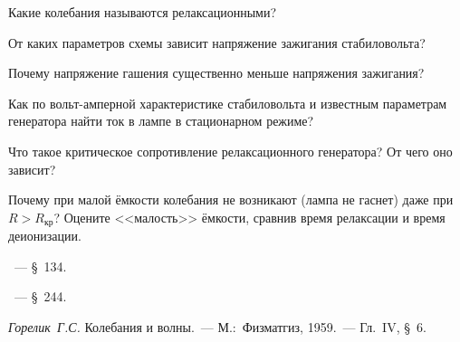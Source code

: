 \begin{lab:questions}
	\item Какие колебания называются релаксационными?

	\item От каких параметров схемы зависит напряжение зажигания стабиловольта?

	\item Почему напряжение гашения существенно меньше напряжения зажигания?


	\item Как по вольт-амперной характеристике стабиловольта и известным
параметрам генератора найти ток в лампе в стационарном режиме?

	\item Что такое критическое сопротивление релаксационного генератора? От
чего оно зависит?


	\item *Почему при малой ёмкости колебания не возникают (лампа не гаснет) даже
при $R>R_{\text{кр}}$? Оцените <<малость>> ёмкости,
сравнив время релаксации и время деионизации.

\end{lab:questions}

\pagebreak

\begin{lab:literature}

	\item \SivuhinIII~--- \S~134.

	\item \Kalashnikov~--- \S~244.

	\item \emph{Горелик~Г.С.} Колебания и волны.~--- М.:~Физматгиз, 1959.~---
Гл.~IV, \S~6.
\end{lab:literature}
